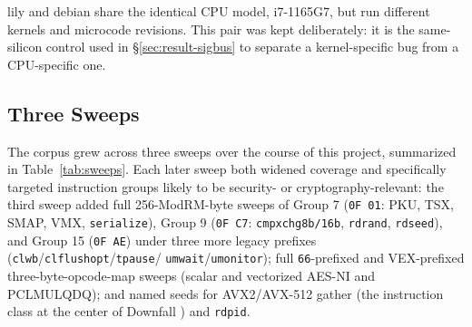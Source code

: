\documentclass[11pt]{article}
\newcommand{\code}[1]{\texttt{#1}}
\begin{document}
\begin{table}[h]
\centering
\caption{Fleet used for this report, ordered by CPU release year.}
\label{tab:fleet}
\end{table}

lily and debian share the identical CPU model, i7-1165G7, but run
different kernels and microcode revisions. This pair was kept
deliberately: it is the same-silicon control used in
\S\ref{sec:result-sigbus} to separate a kernel-specific bug from a
CPU-specific one.

\subsection{Three Sweeps}
\label{sec:corpus}

The corpus grew across three sweeps over the course of this project,
summarized in Table~\ref{tab:sweeps}. Each later sweep both widened
coverage and specifically targeted instruction groups likely to be
security- or cryptography-relevant: the third sweep added full
256-ModRM-byte sweeps of Group 7 (\code{0F 01}: PKU, TSX, SMAP, VMX,
\code{serialize}), Group 9 (\code{0F C7}: \code{cmpxchg8b/16b},
\code{rdrand}, \code{rdseed}), and Group 15 (\code{0F AE}) under three
more legacy prefixes (\code{clwb}/\code{clflushopt}/\code{tpause}/
\code{umwait}/\code{umonitor}); full \code{66}-prefixed and VEX-prefixed
three-byte-opcode-map sweeps (scalar and vectorized AES-NI and
PCLMULQDQ); and named seeds for AVX2/AVX-512 gather (the instruction
class at the center of Downfall \cite{moghimi2023downfall}) and
\code{rdpid}.
\end{document}
